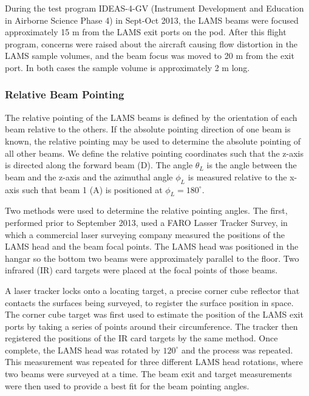 \documentclass[12pt,twoside,english]{article}\usepackage[]{graphicx}\usepackage[]{color}
\let\OrgIndex\index
\renewcommand*{\index}[1]{\OrgIndex{#1}}
\begin{document}
During the test program IDEAS-4-GV (Instrument Development and Education in Airborne Science Phase 4) in Sept-Oct 2013, the LAMS beams were focused approximately 15 m from the LAMS exit ports on the pod. After this flight program, concerns were raised about the aircraft causing flow distortion in the LAMS sample  volumes, and the beam focus was moved to 20 m from the exit port. In both cases the sample volume is approximately 2 m long. 

\subsubsection{Relative Beam Pointing}

The relative pointing of the LAMS beams is defined by the orientation of each beam relative to the others. If the absolute pointing direction of one beam is known, the relative pointing may be used to determine the absolute pointing of all other beams. We define the relative pointing coordinates such that the z-axis is directed along the forward beam (D). The angle $\theta_{L}$ is the angle between the beam and the z-axis and the azimuthal angle $\phi_{L}$ is measured relative to the x-axis such that beam 1 (A) is positioned at $\phi_{L}=180^{\circ}$.

Two methods were used to determine the relative pointing angles. The first, performed prior to September 2013, used a FARO Lasser Tracker Survey, in which a commercial laser surveying company measured the positions of the LAMS head and the beam focal points. The 
LAMS head was positioned in the hangar so the bottom two beams were approximately parallel to the floor. Two infrared (IR) card targets were placed at the focal points of those beams. 

A laser tracker locks onto a locating target, a precise corner cube reflector that contacts the surfaces being surveyed, to register the surface
position in space. The corner cube target was first used to estimate the position of the LAMS exit ports by taking a series of points around their circumference. The tracker then registered the positions of the IR card targets by the same method. Once complete, the LAMS head was rotated by $120^{\circ}$ and the process was repeated. This measurement was repeated for three different LAMS head rotations, where two beams were surveyed at a time. 
The beam exit and target measurements were then used to provide a best fit for the beam pointing angles. 
\end{document}
